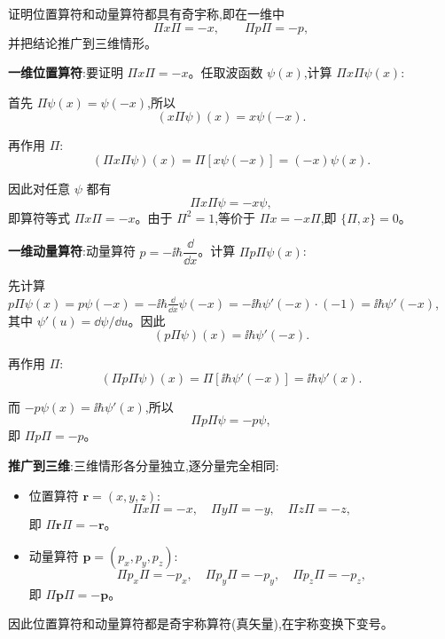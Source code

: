 \begin{question}
证明位置算符和动量算符都具有奇宇称,即在一维中
\[
\Pi x\Pi=-x,
\qquad
\Pi p\Pi=-p,
\]
并把结论推广到三维情形。
\begin{solution}
	\textbf{一维位置算符}:要证明 $\Pi x\Pi = -x$。任取波函数 $\psi(x)$,计算 $\Pi x\Pi\psi(x)$:

	首先 $\Pi\psi(x)=\psi(-x)$,所以
	\[
	(x\Pi\psi)(x)=x\psi(-x).
	\]

	再作用 $\Pi$:
	\[
	(\Pi x\Pi\psi)(x)=\Pi[x\psi(-x)]=(-x)\psi(x).
	\]

	因此对任意 $\psi$ 都有
	\[
	\Pi x\Pi\psi = -x\psi,
	\]
	即算符等式 $\boxed{\Pi x\Pi = -x}$。由于 $\Pi^2=1$,等价于 $\Pi x = -x\Pi$,即 $\{\Pi,x\}=0$。

	\textbf{一维动量算符}:动量算符 $p = -\ii\hbar\dfrac{\dd}{\dd x}$。计算 $\Pi p\Pi\psi(x)$:

	先计算 $p\Pi\psi(x)=p\psi(-x)=-\ii\hbar\frac{\dd}{\dd x}\psi(-x)=-\ii\hbar\psi'(-x)\cdot(-1)=\ii\hbar\psi'(-x)$,
	其中 $\psi'(u)=\dd\psi/\dd u$。因此
	\[
	(p\Pi\psi)(x)=\ii\hbar\psi'(-x).
	\]

	再作用 $\Pi$:
	\[
	(\Pi p\Pi\psi)(x)=\Pi[\ii\hbar\psi'(-x)]=\ii\hbar\psi'(x).
	\]

	而 $-p\psi(x)=\ii\hbar\psi'(x)$,所以
	\[
	\Pi p\Pi\psi = -p\psi,
	\]
	即 $\boxed{\Pi p\Pi = -p}$。

	\textbf{推广到三维}:三维情形各分量独立,逐分量完全相同:
	\begin{itemize}
	\item 位置算符 $\mathbf r=(x,y,z)$:
	\[
	\Pi x\Pi = -x,\quad \Pi y\Pi = -y,\quad \Pi z\Pi = -z,
	\]
	即 $\boxed{\Pi\mathbf r\Pi = -\mathbf r}$。
	\item 动量算符 $\mathbf p=(p_x,p_y,p_z)$:
	\[
	\Pi p_x\Pi = -p_x,\quad \Pi p_y\Pi = -p_y,\quad \Pi p_z\Pi = -p_z,
	\]
	即 $\boxed{\Pi\mathbf p\Pi = -\mathbf p}$。
	\end{itemize}

	因此位置算符和动量算符都是奇宇称算符(真矢量),在宇称变换下变号。
	\end{solution}
\end{question}

